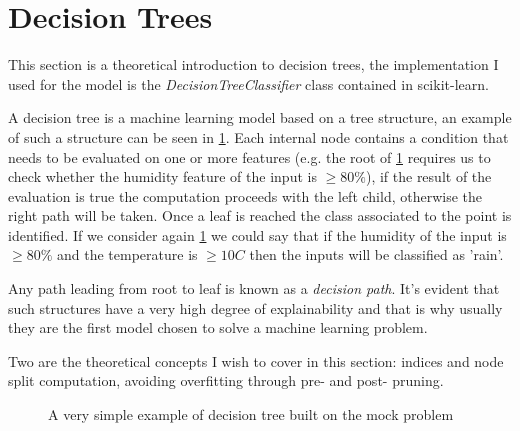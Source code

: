 \section{Decision Trees}
\label{sec:dt}
This section is a theoretical introduction to decision trees, the implementation I used for the
model is the \emph{DecisionTreeClassifier} class contained in scikit-learn.

\medskip

A decision tree is a machine learning model based on a tree structure, an example of such a
structure can be seen in \cref{fig:simple-dt}. Each internal node contains a condition that needs to
be evaluated on one or more features (e.g. the root of \cref{fig:simple-dt} requires us to check
whether the humidity feature of the input is $\geq 80\%$), if the result of the evaluation is true
the computation proceeds with the left child, otherwise the right path will be taken. Once a leaf is
reached the class associated to the point is identified. If we consider again \cref{fig:simple-dt}
we could say that if the humidity of the input is $\geq 80\%$ and the temperature is $\geq 10C$ then
the inputs will be classified as 'rain'.

Any path leading from root to leaf is known as a \emph{decision path}. It's evident that such structures have a very high degree of explainability and that is why usually they are the first model chosen to solve a machine learning problem.

\medskip

Two are the theoretical concepts I wish to cover in this section: indices and node split
computation, avoiding overfitting through pre- and post- pruning.
\begin{figure}
	\centering
	\caption{A very simple example of decision tree built on the mock problem}
	\label{fig:simple-dt}
\end{figure}

